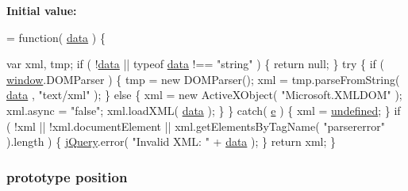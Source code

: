 {\bfseries Initial value\-:}
\begin{DoxyCode}
= \textcolor{keyword}{function}( \hyperlink{jquery-1_810_82-vsdoc_8js_a609407b3456fdc3c5671a9fc4a226ff7}{data} ) \{


        var xml, tmp;
        \textcolor{keywordflow}{if} ( !\hyperlink{jquery-1_810_82-vsdoc_8js_a609407b3456fdc3c5671a9fc4a226ff7}{data} || typeof \hyperlink{jquery-1_810_82-vsdoc_8js_a609407b3456fdc3c5671a9fc4a226ff7}{data} !== \textcolor{stringliteral}{"string"} ) \{
            \textcolor{keywordflow}{return} null;
        \}
        \textcolor{keywordflow}{try} \{
            \textcolor{keywordflow}{if} ( \hyperlink{jquery-1_810_82-vsdoc_8js_a04a8a2bbfa9c15500892b8e5033d625b}{window}.DOMParser ) \{ 
                tmp = \textcolor{keyword}{new} DOMParser();
                xml = tmp.parseFromString( \hyperlink{jquery-1_810_82-vsdoc_8js_a609407b3456fdc3c5671a9fc4a226ff7}{data} , \textcolor{stringliteral}{"text/xml"} );
            \} \textcolor{keywordflow}{else} \{ 
                xml = \textcolor{keyword}{new} ActiveXObject( \textcolor{stringliteral}{"Microsoft.XMLDOM"} );
                xml.async = \textcolor{stringliteral}{"false"};
                xml.loadXML( \hyperlink{jquery-1_810_82-vsdoc_8js_a609407b3456fdc3c5671a9fc4a226ff7}{data} );
            \}
        \} \textcolor{keywordflow}{catch}( \hyperlink{jquery-1_810_82_8min_8js_a2c038346d47955cbe2cb91e338edd7e1}{e} ) \{
            xml = \hyperlink{jquery-1_810_82-vsdoc_8js_a08113a236cc18d2a9d5ce27e638012be}{undefined};
        \}
        \textcolor{keywordflow}{if} ( !xml || !xml.documentElement || xml.getElementsByTagName( \textcolor{stringliteral}{"parsererror"} ).length ) \{
            \hyperlink{jquery-1_810_82-vsdoc_8js_add5237586d970a38a81f990e8eb28c6c}{jQuery}.error( \textcolor{stringliteral}{"Invalid XML: "} + \hyperlink{jquery-1_810_82-vsdoc_8js_a609407b3456fdc3c5671a9fc4a226ff7}{data} );
        \}
        \textcolor{keywordflow}{return} xml;
    \}
\end{DoxyCode}
\hypertarget{jquery-1_810_82-vsdoc_8js_a0a2a38b3281bb5c9cf0c479a04b513cb}{
\subsubsection[{position}]{ {\bf prototype} position}}\label{jquery-1_810_82-vsdoc_8js_a0a2a38b3281bb5c9cf0c479a04b513cb}
